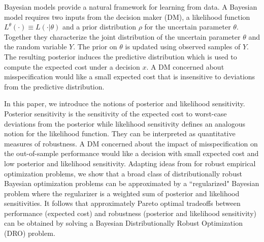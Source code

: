 \documentclass[11pt,reqno,letter]{amsart}
\theoremstyle{plain}
\theoremstyle{definition}
\numberwithin{equation}{section}
\numberwithin{theorem}{section}
\numberwithin{table}{section}
\numberwithin{figure}{section}
\begin{document}
Bayesian models provide a natural framework for learning from data. A Bayesian model requires two inputs from the decision maker (DM), a  likelihood function $L^\theta(\cdot) \equiv L(\cdot|\theta)$ and a prior distribution $\rho$ for the uncertain parameter $\theta$. Together they characterize the joint distribution of the uncertain parameter $\theta$ and the random variable $Y$. The prior on $\theta$ is updated using observed samples of $Y$. The resulting posterior   induces the predictive distribution which is used to compute the expected cost under a decision $x$. A DM  concerned about misspecification would like a small expected cost that is insensitive  to deviations from the predictive distribution.

In this paper, we introduce the notions of posterior and likelihood sensitivity. Posterior sensitivity is the sensitivity of the expected cost to worst-case deviations from the posterior while likelihood sensitivity defines an analogous notion for the likelihood function. They can be interpreted as quantitative measures of robustness.  A DM  concerned about the impact of misspecification on the out-of-sample performance  would like a decision with small expected cost and low posterior and likelihood sensitivity. 
Adapting ideas from \cite{gotoh2018robust,gotoh2021calibration,gotoh2026sensitivity} for robust empirical optimization problems, we show that a broad class of distributionally robust Bayesian optimization problems can be approximated by a ``regularized" Bayesian problem where the regularizer is a weighted sum of posterior and likelihood sensitivities. It follows that approximately Pareto optimal tradeoffs between performance (expected cost) and robustness (posterior and likelihood sensitivity) can be obtained by solving a Bayesian Distributionally Robust Optimization (DRO) problem. 
\end{document}
